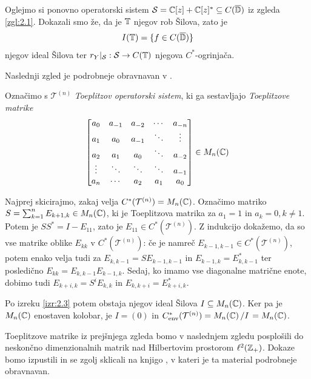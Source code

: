 \begin{zgled}
    Oglejmo si ponovno operatorski sistem 
    $\mathcal{S} = \mathbb C[z] + \mathbb C[z]^* \subseteq C(\overline{\mathbb D})$
    iz zgleda \ref{zgl:2.1}. 
    Dokazali smo že, da je $\mathbb T$ njegov rob Šilova, zato je 
    $$I(\mathbb T) = \{f \in C(\overline{\mathbb D})\}$$ 
    njegov ideal Šilova ter
    $r_Y |_{\mathcal{S}}: \mathcal{S} \to C(\mathbb T)$ njegova $C^*$-ogrinjača.
\end{zgled}

Naslednji zgled je podrobneje obravnavan v \cite{connes2021}.

\begin{zgled} \label{zgl:2.2}
    Označimo s $\mathcal{T}^{(n)}$ \emph{Toeplitzov operatorski sistem}, ki ga sestavljajo \emph{Toeplitzove matrike}  
    $$\begin{bmatrix}
        a_0 & a_{-1} & a_{-2} & \cdots & a_{-n}\\
        a_{1} & a_0 & a_{-1} & \ddots & \vdots\\
        a_{2} & a_1 & a_0 & \ddots & a_{-2}\\
        \vdots & \ddots & \ddots & \ddots & a_{-1}\\
        a_{n} & \cdots & a_{2} & a_{1} & a_0
    \end{bmatrix} \in M_n (\mathbb C)$$
    
    Najprej skicirajmo, zakaj velja $C^*(\mathcal{T}^{(n)}) = M_n (\mathbb C)$.
    Označimo matriko $S = \sum_{k = 1} ^n E_{k+1, k} \in M_n (\mathbb C)$, ki je Toeplitzova matrika za $a_{1} = 1$ in $a_k = 0, k \neq 1$.
    Potem je $S S^* = I - E_{11}$, zato je $E_{11} \in C^*(\mathcal{T}^{(n)})$.
    Z indukcijo dokažemo, da so vse matrike oblike $E_{kk}$ v $C^*(\mathcal{T}^{(n)})$:
    če je namreč $E_{k - 1, k - 1} \in C^*(\mathcal{T}^{(n)})$, potem enako velja tudi za $E_{k, k - 1} = S E_{k - 1, k - 1}$
    in $E_{k-1, k} = E_{k, k - 1}^*$ ter posledično $E_{kk} = E_{k, k - 1} E_{k - 1, k}$.
    Sedaj, ko imamo vse diagonalne matrične enote, dobimo tudi 
    $E_{k + i, k} = S^i E_{k, k}$ in $E_{k, k + i} = E_{k + i, k}^*$.

    Po izreku \ref{izr:2.3} potem obstaja njegov ideal Šilova $I \subseteq M_n (\mathbb C)$.
    Ker pa je $M_n (\mathbb C)$ enostaven kolobar, je $I = (0)$ in $C^* _{\env} (\mathcal{T}^{(n)}) = \quot{M_n (\C)}{I} = M_n (\C)$.
\end{zgled}

Toeplitzove matrike iz prejšnjega zgleda bomo v naslednjem zgledu posplošili do neskončno dimenzionalnih matrik nad Hilbertovim prostorom $\ell^2 (\mathbb Z_+)$.
Dokaze bomo izpustili in se zgolj sklicali na knjigo \cite{arveson2002}, v kateri je ta material podrobneje obravnavan.

